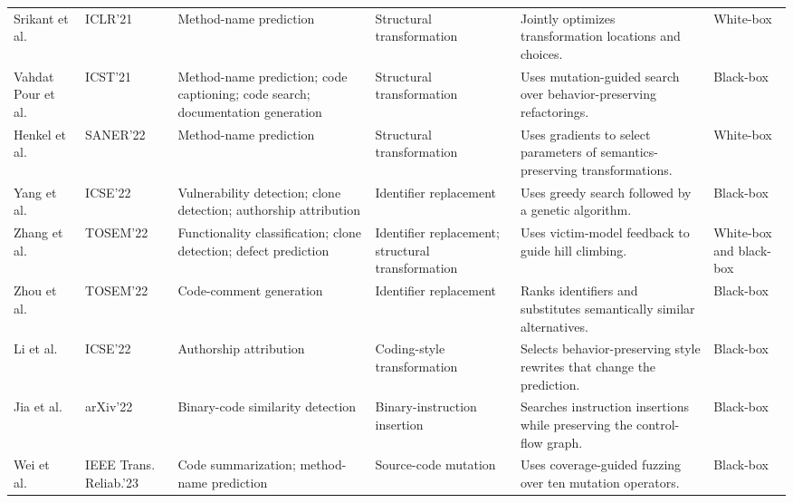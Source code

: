 \documentclass[acmsmall,screen,review]{acmart}
\begin{document}
{\begin{longtable}{@{}L{2.1cm}L{1.5cm}L{2.30cm}L{2.50cm}L{3.50cm}L{1.35cm}@{}}
Srikant et al.~\cite{srikant2021generating} &
ICLR'21 &
Method-name prediction &
Structural transformation &
Jointly optimizes transformation locations and choices. &
White-box \\

Vahdat Pour et al.~\cite{vahdatpour2021search} &
ICST'21 &
Method-name prediction; code captioning; code search; documentation generation &
Structural transformation &
Uses mutation-guided search over behavior-preserving refactorings. &
Black-box \\

Henkel et al.~\cite{ramakrishnan2022semantic} &
SANER\allowbreak'22 &
Method-name prediction &
Structural transformation &
Uses gradients to select parameters of semantics-preserving transformations. &
White-box \\

Yang et al.~\cite{yang2022natural} &
ICSE'22 &
Vulnerability detection; clone detection; authorship attribution &
Identifier replacement &
Uses greedy search followed by a genetic algorithm. &
Black-box \\

Zhang et al.~\cite{zhang2022carrot} &
TOSEM\allowbreak'22 &
Functionality classification; clone detection; defect prediction &
Identifier replacement; structural transformation &
Uses victim-model feedback to guide hill climbing. &
White-box and black-box \\

Zhou et al.~\cite{zhou2022accent} &
TOSEM\allowbreak'22 &
Code-comment generation &
Identifier replacement &
Ranks identifiers and substitutes semantically similar alternatives. &
Black-box \\

Li et al.~\cite{li2022ropgen} &
ICSE'22 &
Authorship attribution &
Coding-style transformation &
Selects behavior-preserving style rewrites that change the prediction. &
Black-box \\

Jia et al.~\cite{funcfooler2022} &
arXiv'22 &
Binary-code similarity detection &
Binary-instruction insertion &
Searches instruction insertions while preserving the control-flow graph. &
Black-box \\

Wei et al.~\cite{wei2022cocofuzzing} &
IEEE Trans. Reliab.'23 &
Code summarization; method-name prediction &
Source-code mutation &
Uses coverage-guided fuzzing over ten mutation operators. &
Black-box \\


\end{longtable}}
\end{document}
